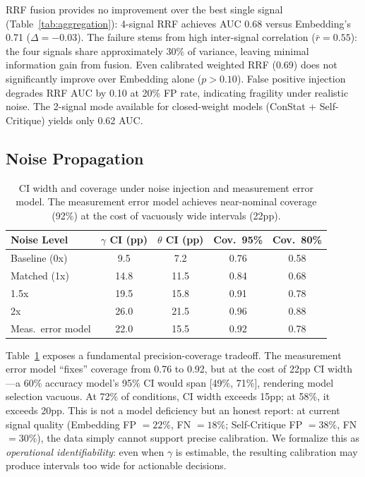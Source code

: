 \documentclass[letterpaper,11pt]{article}
\begin{document}
RRF fusion provides no improvement over the best single signal (Table~\ref{tab:aggregation}): 4-signal RRF achieves AUC 0.68 versus Embedding's 0.71 ($\Delta = -0.03$).
The failure stems from high inter-signal correlation ($\bar{r} = 0.55$): the four signals share approximately 30\% of variance, leaving minimal information gain from fusion.
Even calibrated weighted RRF (0.69) does not significantly improve over Embedding alone ($p > 0.10$).
False positive injection degrades RRF AUC by 0.10 at 20\% FP rate, indicating fragility under realistic noise.
The 2-signal mode available for closed-weight models (ConStat + Self-Critique) yields only 0.62 AUC.

\subsection{Noise Propagation}
\label{sec:noise}

\begin{table}[t]
\centering
\caption{CI width and coverage under noise injection and measurement error model. The measurement error model achieves near-nominal coverage (92\%) at the cost of vacuously wide intervals (22pp).}
\label{tab:noise_prop}
\begin{tabular}{@{}lcccc@{}}
\toprule
Noise Level & $\gamma$ CI (pp) & $\theta$ CI (pp) & Cov.\ 95\% & Cov.\ 80\% \\
\midrule
Baseline (0x) & 9.5 & 7.2 & 0.76 & 0.58 \\
Matched (1x) & 14.8 & 11.5 & 0.84 & 0.68 \\
1.5x & 19.5 & 15.8 & 0.91 & 0.78 \\
2x & 26.0 & 21.5 & 0.96 & 0.88 \\
Meas.\ error model & 22.0 & 15.5 & 0.92 & 0.78 \\
\bottomrule
\end{tabular}
\end{table}

Table~\ref{tab:noise_prop} exposes a fundamental precision-coverage tradeoff.
The measurement error model ``fixes'' coverage from 0.76 to 0.92, but at the cost of 22pp CI width---a 60\% accuracy model's 95\% CI would span [49\%, 71\%], rendering model selection vacuous.
At 72\% of conditions, CI width exceeds 15pp; at 58\%, it exceeds 20pp.
This is not a model deficiency but an honest report: at current signal quality (Embedding FP $= 22\%$, FN $= 18\%$; Self-Critique FP $= 38\%$, FN $= 30\%$), the data simply cannot support precise calibration.
We formalize this as \emph{operational identifiability}: even when $\gamma$ is estimable, the resulting calibration may produce intervals too wide for actionable decisions.
\end{document}

